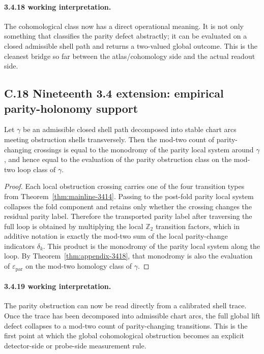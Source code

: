 \paragraph{3.4.18 working interpretation.}
The cohomological class now has a direct operational meaning. It is not only something that classifies the parity defect abstractly; it can be evaluated on a closed admissible shell path and returns a two-valued global outcome. This is the cleanest bridge so far between the atlas/cohomology side and the actual readout side.



\subsection*{C.18 Nineteenth 3.4 extension: empirical parity-holonomy support}

\begin{theorem}
\label{thm:appendix-3419}
Let $\gamma$ be an admissible closed shell path decomposed into stable chart arcs meeting obstruction shells transversely. Then the mod-two count of parity-changing crossings is equal to the monodromy of the parity local system around $\gamma$, and hence equal to the evaluation of the parity obstruction class on the mod-two loop class of $\gamma$.
\end{theorem}

\begin{proof}
Each local obstruction crossing carries one of the four transition types from Theorem~\ref{thm:mainline-3414}. Passing to the post-fold parity local system collapses the fold component and retains only whether the crossing changes the residual parity label. Therefore the transported parity label after traversing the full loop is obtained by multiplying the local $\mathbb Z_2$ transition factors, which in additive notation is exactly the mod-two sum of the local parity-change indicators $\delta_k$. This product is the monodromy of the parity local system along the loop. By Theorem~\ref{thm:appendix-3418}, that monodromy is also the evaluation of $\varepsilon_{\mathrm{par}}$ on the mod-two homology class of $\gamma$.
\end{proof}

\paragraph{3.4.19 working interpretation.}
The parity obstruction can now be read directly from a calibrated shell trace. Once the trace has been decomposed into admissible chart arcs, the full global lift defect collapses to a mod-two count of parity-changing transitions. This is the first point at which the global cohomological obstruction becomes an explicit detector-side or probe-side measurement rule.


